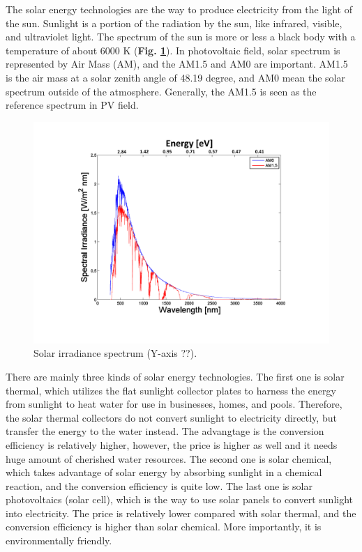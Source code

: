 \documentclass[a4paper, 12pt, titlepage,oneside,drop]{kthesis}
\begin{document}
The solar energy technologies are the way to produce electricity from the light of the sun. Sunlight is a portion of the radiation by the sun, like infrared, visible,
and ultraviolet light. The spectrum of the sun is more or less a black body with a temperature of about 6000 K (\textbf{Fig. \ref{spectrumsun}}). In photovoltaic field, solar spectrum is represented by Air Mass (AM), 
and the AM1.5 and AM0 are important. AM1.5 is the air mass at a solar zenith angle of 48.19 degree, and AM0 mean the solar spectrum outside of the atmosphere. Generally, the AM1.5 is seen as the reference spectrum in PV field.

\begin{figure}[H]
\centering
\includegraphics[scale=0.4]{spectrum.pdf}
\caption{Solar irradiance spectrum (Y-axis ??).}
\label{spectrumsun}
\end{figure}

There are mainly three kinds of solar energy technologies. The first one is solar thermal,
which utilizes the flat sunlight collector plates to harness the energy from sunlight to heat water for use in businesses, homes, and pools.
Therefore, the solar thermal collectors do not convert sunlight to electricity directly, but transfer the energy to the water instead. The advangtage is the conversion efficiency 
is relatively higher, however, the price is higher as well and it needs huge amount of cherished water resources. The second one is solar chemical, which takes advantage of solar 
energy by absorbing sunlight in a chemical reaction, and the conversion efficiency is quite low. The last one is solar photovoltaics (solar cell), which is the way
to use solar panels to convert sunlight into electricity. The price is relatively lower compared with solar thermal, and the conversion efficiency is higher than solar chemical. More importantly, it is
environmentally friendly.
\end{document}
